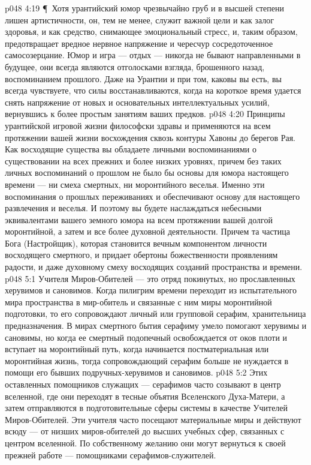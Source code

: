 \vs p048 4:19 \P\ Хотя урантийский юмор чрезвычайно груб и в высшей степени лишен артистичности, он, тем не менее, служит важной цели и как залог здоровья, и как средство, снимающее эмоциональный стресс, и, таким образом, предотвращает вредное нервное напряжение и чересчур сосредоточенное самосозерцание. Юмор и игра --- отдых --- никогда не бывают направленными в будущее, они всегда являются отголосками взгляда, брошенного назад, воспоминанием прошлого. Даже на Урантии и при том, каковы вы есть, вы всегда чувствуете, что силы восстанавливаются, когда на короткое время удается снять напряжение от новых и основательных интеллектуальных усилий, вернувшись к более простым занятиям ваших предков.
\vs p048 4:20 Принципы урантийской игровой жизни философски здравы и применяются на всем протяжении вашей жизни восхождения сквозь контуры Хавоны до берегов Рая. Как восходящие существа вы обладаете личными воспоминаниями о существовании на всех прежних и более низких уровнях, причем без таких личных воспоминаний о прошлом не было бы основы для юмора настоящего времени --- ни смеха смертных, ни моронтийного веселья. Именно эти воспоминания о прошлых переживаниях и обеспечивают основу для настоящего развлечения и веселья. И поэтому вы будете наслаждаться небесными эквивалентами вашего земного юмора на всем протяжении вашей долгой моронтийной, а затем и все более духовной деятельности. Причем та частица Бога (Настройщик), которая становится вечным компонентом личности восходящего смертного, и придает обертоны божественности проявлениям радости, и даже духовному смеху восходящих созданий пространства и времени.
\vs p048 5:1 Учителя Миров\hyp{}Обителей --- это отряд покинутых, но прославленных херувимов и сановимов. Когда пилигрим времени переходит из испытательного мира пространства в мир\hyp{}обитель и связанные с ним миры моронтийной подготовки, то его сопровождают личный или групповой серафим, хранительница предназначения. В мирах смертного бытия серафиму умело помогают херувимы и сановимы, но когда ее смертный подопечный освобождается от оков плоти и вступает на моронтийный путь, когда начинается постматериальная или моронтийная жизнь, тогда сопровождающий серафим больше не нуждается в помощи его бывших подручных\hyp{}херувимов и сановимов.
\vs p048 5:2 Этих оставленных помощников служащих --- серафимов часто созывают в центр вселенной, где они переходят в тесные объятия Вселенского Духа\hyp{}Матери, а затем отправляются в подготовительные сферы системы в качестве Учителей Миров\hyp{}Обителей. Эти учителя часто посещают материальные миры и действуют всюду --- от низших миров\hyp{}обителей до высших учебных сфер, связанных с центром вселенной. По собственному желанию они могут вернуться к своей прежней работе --- помощниками серафимов\hyp{}служителей.
